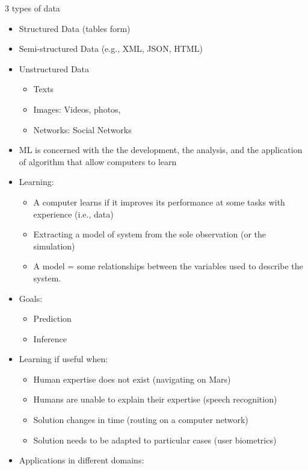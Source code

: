 \documentclass[
]{book}
\providecommand{\tightlist}{%
  \setlength{\itemsep}{0pt}\setlength{\parskip}{0pt}}
\begin{document}
3 types of data

\begin{itemize}
\item
  Structured Data (tables form)
\item
  Semi-structured Data (e.g., XML, JSON, HTML)
\item
  Unstructured Data

  \begin{itemize}
  \tightlist
  \item
    Texts
  \item
    Images: Videos, photos,
  \item
    Networks: Social Networks
  \end{itemize}
\item
  ML is concerned with the the development, the analysis, and the application of algorithm that allow computers to learn
\item
  Learning:

  \begin{itemize}
  \tightlist
  \item
    A computer learns if it improves its performance at some tasks with experience (i.e., data)
  \item
    Extracting a model of system from the sole observation (or the simulation)
  \item
    A model = some relationships between the variables used to describe the system.
  \end{itemize}
\item
  Goals:

  \begin{itemize}
  \tightlist
  \item
    Prediction
  \item
    Inference
  \end{itemize}
\item
  Learning if useful when:

  \begin{itemize}
  \tightlist
  \item
    Human expertise does not exist (navigating on Mars)
  \item
    Humans are unable to explain their expertise (speech recognition)
  \item
    Solution changes in time (routing on a computer network)
  \item
    Solution needs to be adapted to particular cases (user biometrics)
  \end{itemize}
\item
  Applications in different domains:


\end{itemize}
\end{document}
